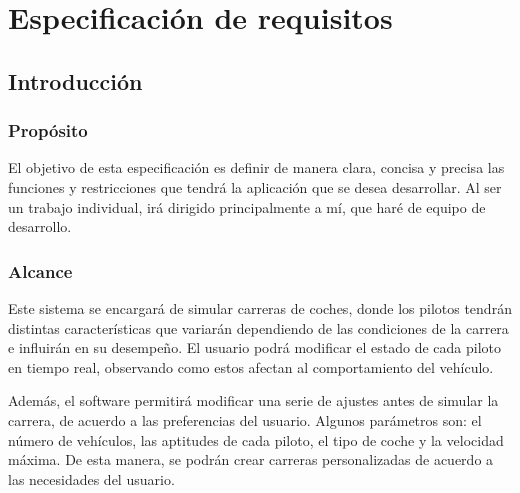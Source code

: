 


\chapter{Especificación de requisitos}

\section{Introducción}

\subsection{Propósito}
El objetivo de esta especificación es definir de manera clara, concisa y precisa las funciones y restricciones que tendrá la aplicación que se desea desarrollar. Al ser un trabajo individual, irá dirigido principalmente a mí, que haré de equipo de desarrollo.

\subsection{Alcance}

Este sistema se encargará de simular carreras de coches, donde los pilotos tendrán distintas características que variarán dependiendo de las condiciones de la carrera e influirán en su desempeño. El usuario podrá modificar el estado de cada piloto en tiempo real, observando como estos afectan al comportamiento del vehículo.

\bigskip

Además, el software permitirá modificar una serie de ajustes antes de simular la carrera, de acuerdo a las preferencias del usuario. Algunos parámetros son: el número de vehículos, las aptitudes de cada piloto, el tipo de coche y la velocidad máxima. De esta manera, se podrán crear carreras personalizadas de acuerdo a las necesidades del usuario.

